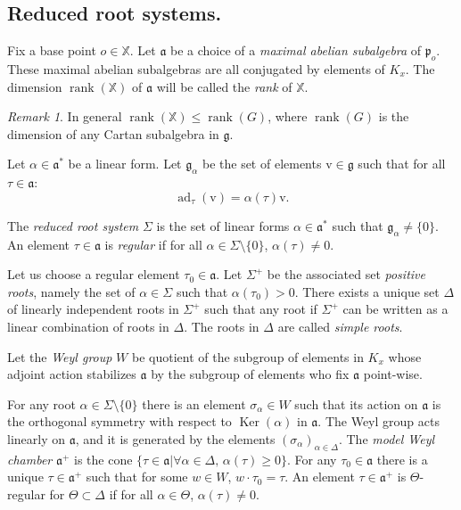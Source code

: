 \documentclass[reqno,10pt]{amsart}
\theoremstyle{plain}
\theoremstyle{definition}
\theoremstyle{remark}
\newtheorem{rem}[thm]{Remark}
\newcommand{\type}{\tau}
\newcommand{\typeS}{{\tau_0}}
\DeclareMathOperator{\ad}{ad}
\DeclareMathOperator{\Ker}{Ker}
\DeclareMathOperator{\rank}{rank}
\newcommand{\X}{\mathbb{X}}
\newcommand{\ie}{namely }
\begin{document}
\subsection{Reduced root systems.}
\label{subsec:RootSystems}
Fix a base point $o\in \X$. Let $\mathfrak{a}$ be a choice of a \emph{maximal abelian subalgebra} of $\mathfrak{p}_o$. These maximal abelian subalgebras are all conjugated by elements of $K_x$. The dimension $\rank(\X)$ of $\mathfrak{a}$ will be called the \emph{rank} of $\X$.

\begin{rem}
In general $\rank(\X)\leq \rank(G)$, where $\rank(G)$ is the dimension of any Cartan subalgebra in $\mathfrak{g}$.
\end{rem}

Let $\alpha\in \mathfrak{a}^*$ be a linear form. Let $\mathfrak{g}_\alpha$ be the set of elements $\mathrm{v}\in\mathfrak{g}$ such that for all $\type\in \mathfrak{a}$:
$$\ad_\type(\mathrm{v})=\alpha(\type) \mathrm{v}.$$

The \emph{reduced root system} $\Sigma$ is the set of linear forms $\alpha\in \mathfrak{a}^*$ such that $\mathfrak{g}_\alpha\neq \lbrace0\rbrace$.  An element $\type\in\mathfrak{a}$ is \emph{regular} if for all $\alpha \in \Sigma\setminus \lbrace0\rbrace$, $\alpha(\type)\neq 0$. 

\medskip

Let us choose a regular element $\typeS\in \mathfrak{a}$. Let $\Sigma^+$ be the associated set \emph{positive roots}, \ie the set of $\alpha \in \Sigma$ such that $\alpha(\typeS)>0$. There exists a unique set $\Delta$ of linearly independent roots in $\Sigma^+$ such that any root if $\Sigma^+$ can be written as a linear combination of roots in $\Delta$. The roots in $\Delta$ are called \emph{simple roots}. 

\medskip

Let the \emph{Weyl group} $W$ be quotient of the subgroup of elements in $K_x$ whose adjoint action stabilizes $\mathfrak{a}$ by the subgroup of elements who fix $\mathfrak{a}$ point-wise.

For any root $\alpha \in \Sigma\setminus\lbrace0\rbrace$ there is an element $\sigma_\alpha\in W$ such that its action on $\mathfrak{a}$ is the orthogonal symmetry with respect to $\Ker(\alpha)$ in $\mathfrak{a}$. The Weyl group acts linearly on $\mathfrak{a}$, and it is generated by the elements $(\sigma_\alpha)_{\alpha\in \Delta}$.
The \emph{model Weyl chamber} $\mathfrak{a}^+$ is the cone $\lbrace\type\in \mathfrak{a}|\forall \alpha \in \Delta,\, \alpha(\type)\geq 0\rbrace$. For any $\typeS\in \mathfrak{a}$ there is a unique $\type\in \mathfrak{a}^+$ such that for some $w\in W$, $w\cdot \typeS=\type$.  An element $\type\in \mathfrak{a}^+$ is $\Theta$-regular for $\Theta\subset \Delta$ if for all $\alpha \in \Theta$, $\alpha(\type)\neq 0$.
\end{document}
